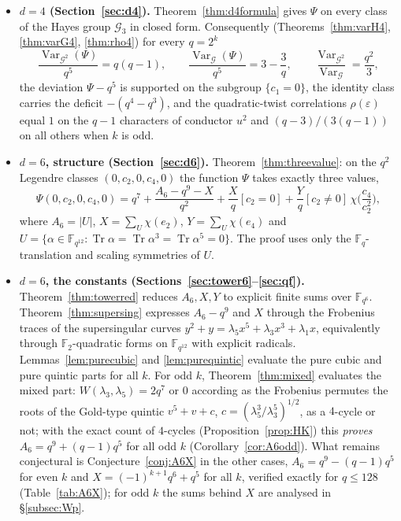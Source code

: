 \documentclass[11pt,a4paper]{amsart}
\theoremstyle{definition}
\newcommand{\F}{\mathbb{F}}
\newcommand{\G}{\mathcal{G}}
\newcommand{\Tr}{\operatorname{Tr}}
\newcommand{\Var}{\operatorname{Var}}
\newcommand{\eps}{\varepsilon}
\begin{document}
\begin{itemize}[leftmargin=2em]
\item \textbf{$d=4$ (Section~\ref{sec:d4}).} Theorem~\ref{thm:d4formula} gives $\Psi$ on every class of the Hayes group $\G_3$ in closed form. Consequently (Theorems~\ref{thm:varH4}, \ref{thm:varG4}, \ref{thm:rho4}) for every $q=2^k$
\[
\frac{\Var_{\G^2}(\Psi)}{q^5}=q(q-1),\qquad \frac{\Var_{\G}(\Psi)}{q^5}=3-\frac3q,\qquad \frac{\Var_{\G^2}}{\Var_{\G}}=\frac{q^2}{3},
\]
the deviation $\Psi-q^5$ is supported on the subgroup $\{c_1=0\}$, the identity class carries the deficit $-(q^4-q^3)$, and the quadratic-twist correlations $\rho(\eps)$ equal $1$ on the $q-1$ characters of conductor $u^2$ and $(q-3)/(3(q-1))$ on all others when $k$ is odd.
\item \textbf{$d=6$, structure (Section~\ref{sec:d6}).} Theorem~\ref{thm:threevalue}: on the $q^2$ Legendre classes $(0,c_2,0,c_4,0)$ the function $\Psi$ takes exactly three values,
\[
\Psi(0,c_2,0,c_4,0)=q^7+\frac{A_6-q^9-X}{q^2}+\frac Xq[c_2=0]+\frac Yq[c_2\ne0]\,\chi\Big(\frac{c_4}{c_2^2}\Big),
\]
where $A_6=|U|$, $X=\sum_U\chi(e_2)$, $Y=\sum_U\chi(e_4)$ and $U=\{\alpha\in\F_{q^{12}}:\Tr\alpha=\Tr\alpha^3=\Tr\alpha^5=0\}$. The proof uses only the $\F_q$-translation and scaling symmetries of $U$.
\item \textbf{$d=6$, the constants (Sections~\ref{sec:tower6}--\ref{sec:qf}).} Theorem~\ref{thm:towerred} reduces $A_6,X,Y$ to explicit finite sums over $\F_{q^6}$. Theorem~\ref{thm:supersing} expresses $A_6-q^9$ and $X$ through the Frobenius traces of the supersingular curves $y^2+y=\lambda_5x^5+\lambda_3x^3+\lambda_1x$, equivalently through $\F_2$-quadratic forms on $\F_{q^{12}}$ with explicit radicals. Lemmas~\ref{lem:purecubic} and \ref{lem:purequintic} evaluate the pure cubic and pure quintic parts for all $k$. For odd $k$, Theorem~\ref{thm:mixed} evaluates the mixed part: $W(\lambda_3,\lambda_5)=2q^7$ or $0$ according as the Frobenius permutes the roots of the Gold-type quintic $v^5+v+c$, $c=(\lambda_5^3/\lambda_3^5)^{1/2}$, as a $4$-cycle or not; with the exact count of $4$-cycles (Proposition~\ref{prop:HK}) this \emph{proves} $A_6=q^9+(q-1)q^5$ for all odd $k$ (Corollary~\ref{cor:A6odd}). What remains conjectural is Conjecture~\ref{conj:A6X} in the other cases, $A_6=q^9-(q-1)q^5$ for even $k$ and $X=(-1)^{k+1}q^6+q^5$ for all $k$, verified exactly for $q\le128$ (Table~\ref{tab:A6X}); for odd $k$ the sums behind $X$ are analysed in \S\ref{subsec:Wp}.

\end{itemize}
\end{document}
